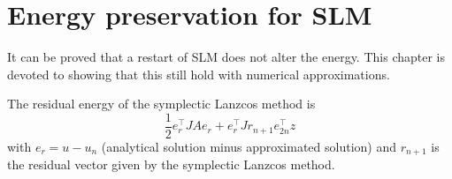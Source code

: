 \chapter{Energy preservation for SLM }
It can be proved that a restart of SLM does not alter the energy. This chapter is devoted to showing that this still hold with numerical approximations.

The residual energy of the symplectic Lanzcos method is
\begin{equation}
\frac{1}{2} e_r^{\top} J A e_r + e_r^\top J r_{n+1} e_{2n}^\top z
\end{equation}
with $ e_r = u-u_n $ (analytical solution minus approximated solution) and $r_{n+1}$ is the residual vector given by the symplectic Lanzcos method. 

